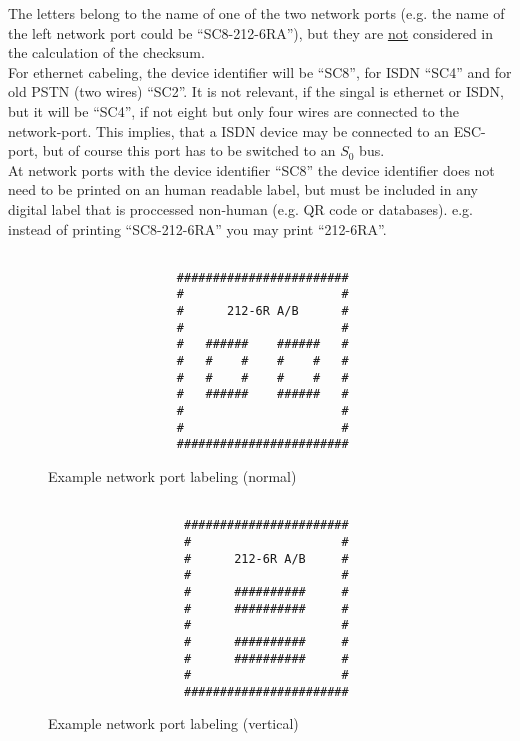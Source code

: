 The letters belong to the name of one of the two network ports (e.g. the
name of the left network port could be ``SC8-212-6RA''), but they are
\underline{not} considered in the calculation of the checksum. \\

For ethernet cabeling, the device identifier will be ``SC8'', for ISDN ``SC4''
and for old PSTN (two wires) ``SC2''. It is not relevant, if the singal is
ethernet or ISDN, but it will be ``SC4'', if not eight but only four wires are
connected to the network-port. This implies, that a ISDN device may be connected
to an ESC-port, but of course this port has to be switched to an $S_0$ bus. \\

At network ports with the device identifier ``SC8'' the device identifier does
not need to be printed on an human readable label, but must be included in any
digital label that is proccessed non-human (e.g. QR code or databases). e.g.
instead of printing ``SC8-212-6RA'' you may print ``212-6RA''.

\begin{minipage}[t]{.42\textwidth}
	\begin{figure}[H]
		\begin{verbatim}

			      ########################
			      #                      #
			      #      212-6R A/B      #
			      #                      #
			      #   ######    ######   #
			      #   #    #    #    #   #
			      #   #    #    #    #   #
			      #   ######    ######   #
			      #                      #
			      #                      #
			      ########################
		\end{verbatim}

		\caption{Example network port labeling (normal)}
	\end{figure}
\end{minipage}
\hfill
\begin{minipage}[t]{.42\textwidth}
	\begin{figure}[H]
		\begin{verbatim}

			       #######################
			       #                     #
			       #      212-6R A/B     #
			       #                     #
			       #      ##########     #
			       #      ##########     #
			       #                     #
			       #      ##########     #
			       #      ##########     #
			       #                     #
			       #######################
		\end{verbatim}

		\caption{Example network port labeling (vertical)}
	\end{figure}
\end{minipage}
